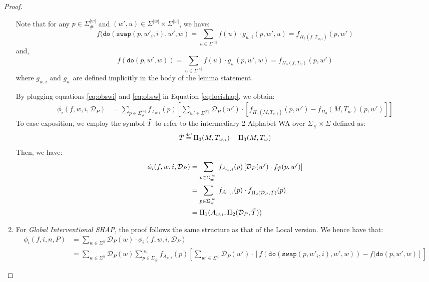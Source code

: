 \begin{proof}
\begin{enumerate}
 Note that for any $p \in \Sigma_{\#}^{|w|}$ and $(w',u) \in \Sigma^{|w|} \times \Sigma^{|w|}$, we have:
 \begin{equation} \label{eq:obswi}
     f(\texttt{do}(\texttt{swap}(p,w'_{i},i),w',w) = \sum\limits_{u \in \Sigma^{|w|}} f(u) \cdot g_{w,i}(p,w',u) = f_{\Pi_{3}(f,T_{w,i})}(p,w')  
 \end{equation}
 and,
 \begin{equation} \label{eq:obsw}
     f(\texttt{do}(p,w',w)) = \sum\limits_{u \in \Sigma^{|w|}} f(u) \cdot g_{w}(p,w',w) = f_{\Pi_{3}(f,T_{w})}(p,w')
 \end{equation}
 where $g_{w,i}$ and $g_{w}$ are defined implicitly in the body of the lemma statement.

 By plugging equations \eqref{eq:obswi} and \eqref{eq:obsw} in Equation \eqref{eq:locishap}, we obtain:
 \begin{align*}
     \phi_i(f,w,i, \mathcal{D}_P) &=  \sum\limits_{p \in \Sigma_{\#}^{|w|}} f_{A_{w,i}}(p) \left[ \sum\limits_{w' \in \Sigma^{|w|}} \mathcal{D}_P(w') \cdot [ f_{\Pi_{3}(M,T_{w,i})}(p,w') - f_{\Pi_{3}}(M, T_{w}) (p,w') ] \right]
 \end{align*}
 To ease exposition, we employ the symbol $\Tilde{T}$ to refer to the intermediary 2-Alphabet WA over $\Sigma_{\#} \times \Sigma$ defined as:
 $$\Tilde{T} \myeq \Pi_{3}(M,T_{w,i}) - \Pi_{3}(M,T_{w})$$
 Then, we have:
\begin{align*}
    \phi_i(f,w,i, \mathcal{D}_P) &= \sum\limits_{p \in \Sigma_{\#}^{|w|}} f_{A_{w,i}}(p) \left[ \mathcal{D}_P(w') \cdot f_{\Tilde{T}}(p,w') \right] \\
    &= \sum\limits_{p \in \Sigma_{\#}^{|w|}} f_{A_{w,i}}(p) \cdot f_{\Pi_{2}(\mathcal{D}_P,\Tilde{T})}(p) \\
    &= \Pi_{1}(A_{w,i}, \Pi_{2}(\mathcal{D}_P,\Tilde{T}))
\end{align*}
  \item For \emph{Global Interventional SHAP}, the proof follows the same structure as that of the Local version. We hence have that:
 \begin{align}
     \phi_i(f,i,n,P) &= \sum\limits_{w \in \Sigma^{n}} \mathcal{D}_P(w) \cdot \phi_i(f,w,i, \mathcal{D}_P) \nonumber \\
     &= \sum\limits_{w \in \Sigma^{n}}  \mathcal{D}_P(w) \sum\limits_{p \in \Sigma_{\#}}^{|w|} f_{A_{w,i}}(p) \left[ \sum\limits_{w' \in \Sigma^{w}} \mathcal{D}_P(w') \cdot \left[ f(\texttt{do}(\texttt{swap}(p,w'_{i},i),w',w)) - f(\texttt{do}(p,w',w)\right] \right] \label{eq:gloishapwa}
 \end{align}


\end{enumerate}
\end{proof}
